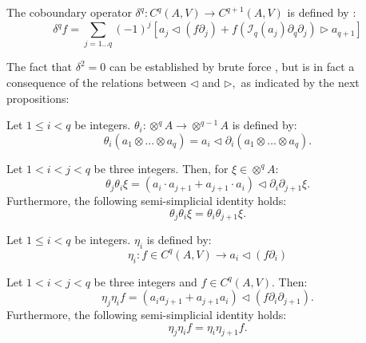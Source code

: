 \begin{defn}
    \label{def:kv_coboundary}
    The coboundary operator $\delta^q \colon C^q \left( A,V \right) \to C^{q+1}\left( A,V \right)$ is defined by \citep{Boyom2002}:
    \begin{equation}
        \label{eq:coboundary}
        \delta^q f = \sum_{j=1 \dots q} \left( -1 \right)^j \left[ a_j  \triangleleft \left(f \partial_j\right) +  f\left( \mathcal{I}_q(a_j)\partial_{q}\partial_j\right)\triangleright a_{q+1}  \right]
    \end{equation}
\end{defn}
The fact that $\delta^2=0$ can be established by brute force \citep{Boyom2002}, but is in fact a consequence of the relations between $\triangleleft$ and $\triangleright,$ as indicated by the next propositions:
\begin{defn}
\label{def:def_theta_op}
Let $1 \leq i < q$ be integers. $\theta_i \colon \otimes^q A \to \otimes^{q-1} A$ is defined by:
\begin{equation}
    \label{eq:def_theta}
    \theta_i \left( a_1 \otimes \dots \otimes a_q 
    \right) = a_i \triangleleft \partial_i \left( a_1 \otimes \dots \otimes a_q 
    \right). 
\end{equation}
\end{defn}
\begin{prop}
\label{prop:theta_simplicial}
Let $1 < i < j < q$ be three integers. Then, for $\xi \in \otimes^q A$:
\begin{equation}
\label{eq:theta_expression}
    \theta_j \theta_i \xi = \left(a_i \cdot a_{j+1}  + a_{j+1}\cdot a_i \right)\triangleleft \partial_i \partial_{j+1} \xi.
\end{equation}
Furthermore, the following semi-simplicial identity holds:
\begin{equation}
    \label{eq:theta_simplicial}
    \theta_j \theta_i \xi = \theta_{i} \theta_{j+1} \xi.
\end{equation}
\end{prop}
\begin{defn}
\label{def:def_theta}
Let $1 \leq i < q$ be integers. $\eta_i$ is defined by:
\begin{equation}
    \label{eq:first_term_delta}
    \eta_i \colon f \in C^q(A,V) \to a_i \triangleleft \left( f \partial_i \right) 
\end{equation}
\end{defn}
\begin{prop}
\label{prop:eta_simplicial}
Let $1 < i < j < q$ be three integers and $f \in C^q(A,V)$. Then:
\begin{equation}
\label{eq:eta_expression}
    \eta_j \eta_i f = \left(a_i a_{j+1}  + a_{j+1} a_i \right)\triangleleft \left(f \partial_i \partial_{j+1} \right).
\end{equation}
Furthermore, the following semi-simplicial identity holds:
\begin{equation}
    \label{eq:eta_simplicial}
    \eta_j \eta_i f = \eta_{i} \eta_{j+1} f.
\end{equation}
\end{prop}
